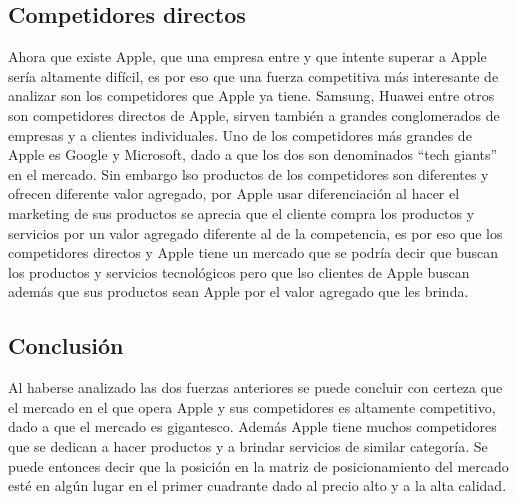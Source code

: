 \documentclass{article}
\begin{document}
\subsection{Competidores directos}
Ahora que existe Apple, que una empresa entre y que intente superar a Apple sería altamente difícil, es por eso que una fuerza competitiva más interesante de analizar son los competidores que Apple ya tiene. Samsung, Huawei entre otros son competidores directos de Apple, sirven también a grandes conglomerados de empresas y a clientes individuales. Uno de los competidores más grandes de Apple es Google y Microsoft, dado a que los dos son denominados ``tech giants'' en el mercado. Sin embargo lso productos de los competidores son diferentes y ofrecen diferente valor agregado, por Apple usar diferenciación al hacer el marketing de sus productos se aprecia que el cliente compra los productos y servicios por un valor agregado diferente al de la competencia, es por eso que los competidores directos y Apple tiene un mercado que se podría decir que buscan los productos y servicios tecnológicos pero que lso clientes de Apple buscan además que sus productos sean Apple por el valor agregado que les brinda.

\subsection{Conclusión}
Al haberse analizado las dos fuerzas anteriores se puede concluir con certeza que el mercado en el que opera Apple y sus competidores es altamente competitivo, dado a que el mercado es gigantesco. Además Apple tiene muchos competidores que se dedican a hacer productos y a brindar servicios de similar categoría. 
Se puede entonces decir que la posición en la matriz de posicionamiento del mercado esté en algún lugar en el primer cuadrante dado al precio alto y a la alta calidad. 
\end{document}
